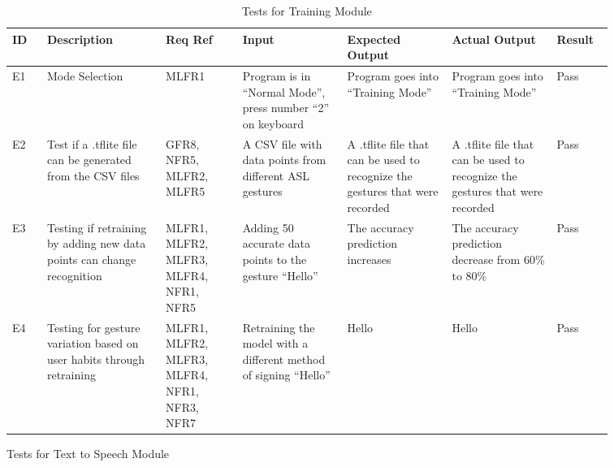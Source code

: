 \documentclass[12pt, titlepage]{article}
\begin{document}
\renewcommand{\arraystretch}{1.2}
\noindent \begin{longtable}{p{0.05\linewidth}|p{0.17\linewidth}|p{0.11\linewidth}|p{0.15\linewidth}|p{0.15\linewidth}|p{0.15\linewidth}|p{0.08\linewidth}}
\hline
\textbf{ID} & \textbf{Description} & \textbf{Req Ref} & \textbf{Input} & \textbf{Expected Output} & \textbf{Actual Output} & \textbf{Result}\\
\hline
E1 & Mode Selection & MLFR1 & Program is in “Normal Mode”, press number “2” on keyboard & Program goes into “Training Mode” & Program goes into “Training Mode” & Pass\\ \hline
E2 & Test if a .tflite file can be generated from the CSV files & GFR8, NFR5, MLFR2, MLFR5 & A CSV file with data points from different ASL gestures & A .tflite file that can be used to  recognize the gestures that were recorded & A .tflite file that can be used to  recognize the gestures that were recorded & Pass\\ \hline
E3 & Testing if retraining by adding new data points can change recognition & MLFR1, MLFR2, MLFR3, MLFR4, NFR1, NFR5 & Adding 50 accurate data points to the gesture “Hello” & The accuracy prediction increases & The accuracy prediction decrease from 60\% to 80\% & Pass\\ \hline
E4 & Testing for gesture variation based on user habits through retraining & MLFR1, MLFR2, MLFR3, MLFR4, NFR1, NFR3, NFR7 & Retraining the model with a different method of signing “Hello” & Hello & Hello & Pass
\hline
\caption{Tests for Training Module}
\end{longtable}

\newpage
\centerline{Tests for Text to Speech Module}
\end{document}

